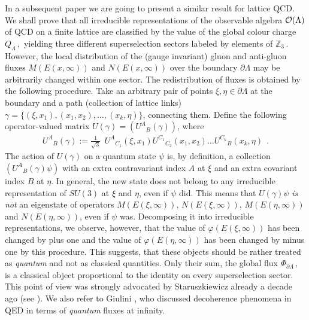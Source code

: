 \documentclass[a4paper,12pt]{article}
\begin{document}
\begin{enumerate}
In a subsequent paper we are going to present a similar result for
lattice QCD. We shall prove that all irreducible representations
of the observable algebra ${\cal O}(\Lambda )$ of QCD on a finite
lattice are classified by the value of the global colour charge
$Q_{\Lambda} \, ,$ yielding three different superselection sectors
labeled by elements of ${\mathbb Z}_3 \, .$ However, the local
distribution of the (gauge invariant) gluon and anti-gluon fluxes
$M(E(x,\infty ))$ and $N(E(x,\infty))$ over the boundary $\partial
\Lambda$ may be arbitrarily changed within one sector. The
redistribution of fluxes is obtained by the following procedure.
Take an arbitrary pair of points $\xi , \eta \in \partial \Lambda$
at the boundary and a path (collection of lattice links) $\gamma =
\{ (\xi ,x_1), (x_1,x_2),\dots , (x_k,\eta )\}$, connecting them.
Define the following operator-valued matrix $U(\gamma) =
\left({U^A}_{B}(\gamma ) \right)$, where
\begin{eqnarray}\label{bigU}
  {U^A}_{B}(\gamma ) := \frac 1{\sqrt{3}} \  \ {U^A}_{C_1}(\xi ,x_1)
  {U^{C_1}}_{C_2}(x_1,x_2) \dots {U^{C_k}}_B(x_k,\eta ) \
   \ .
\end{eqnarray}
The action of $U(\gamma)$ on a quantum state $\psi$ is, by
definition, a collection $\left( {U^A}_{B}(\gamma ) \psi \right)$
with an extra contravariant index $A$ at $\xi$ and an extra
covariant index $B$ at $\eta$. In general, the new state does not
belong to any irreducible representation of $SU(3)$ at $\xi$ and
$\eta$, even if $\psi$ did. This means that $U(\gamma) \psi$ {\em
is not} an eigenstate of operators $M(E(\xi,\infty ))$,
$N(E(\xi,\infty ))$, $M(E(\eta,\infty ))$ and $N(E(\eta,\infty
))$, even if $\psi$ was. Decomposing it into irreducible
representations, we observe, however, that the value of
$\varphi(E(\xi,\infty ))$ has been changed by plus one and the
value of $\varphi(E(\eta,\infty ))$ has been changed by minus one
by this procedure. This suggests, that these objects should be
rather treated as {\em quantum} and not as classical quantities.
Only their sum, the global flux $\Phi_{\partial \Lambda}\, ,$ is a
classical object proportional to the identity on every
superselection sector. This point of view was strongly advocated
by Staruszkiewicz already a decade ago (see \cite{Star}). We also
refer to Giulini \cite{Giu}, who discussed decoherence phenomena
in QED in terms of {\em quantum} fluxes at infinity.


\end{enumerate}
\end{document}
